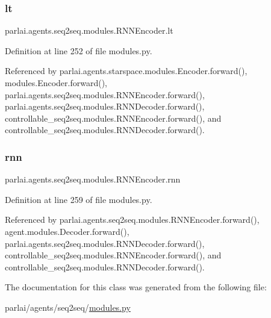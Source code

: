 \mbox{\label{classparlai_1_1agents_1_1seq2seq_1_1modules_1_1RNNEncoder_aa881b82dfbaa8448c66bccf48493fd5d}} 
\subsubsection{\texorpdfstring{lt}{lt}}
{\footnotesize\ttfamily parlai.\+agents.\+seq2seq.\+modules.\+R\+N\+N\+Encoder.\+lt}



Definition at line 252 of file modules.\+py.



Referenced by parlai.\+agents.\+starspace.\+modules.\+Encoder.\+forward(), modules.\+Encoder.\+forward(), parlai.\+agents.\+seq2seq.\+modules.\+R\+N\+N\+Encoder.\+forward(), parlai.\+agents.\+seq2seq.\+modules.\+R\+N\+N\+Decoder.\+forward(), controllable\+\_\+seq2seq.\+modules.\+R\+N\+N\+Encoder.\+forward(), and controllable\+\_\+seq2seq.\+modules.\+R\+N\+N\+Decoder.\+forward().

\mbox{\label{classparlai_1_1agents_1_1seq2seq_1_1modules_1_1RNNEncoder_aa64c67b1bfefa68a3e775a83001d308e}} 
\subsubsection{\texorpdfstring{rnn}{rnn}}
{\footnotesize\ttfamily parlai.\+agents.\+seq2seq.\+modules.\+R\+N\+N\+Encoder.\+rnn}



Definition at line 259 of file modules.\+py.



Referenced by parlai.\+agents.\+seq2seq.\+modules.\+R\+N\+N\+Encoder.\+forward(), agent.\+modules.\+Decoder.\+forward(), parlai.\+agents.\+seq2seq.\+modules.\+R\+N\+N\+Decoder.\+forward(), controllable\+\_\+seq2seq.\+modules.\+R\+N\+N\+Encoder.\+forward(), and controllable\+\_\+seq2seq.\+modules.\+R\+N\+N\+Decoder.\+forward().



The documentation for this class was generated from the following file\+:\begin{DoxyCompactItemize}
\item 
parlai/agents/seq2seq/\hyperlink{parlai_2agents_2seq2seq_2modules_8py}{modules.\+py}\end{DoxyCompactItemize}
